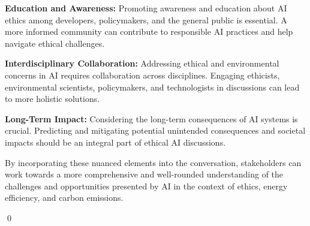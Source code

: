 \begin{enumarabic}
  \item \textbf{Education and Awareness:} Promoting awareness and education about AI ethics among developers, policymakers, and the general public is essential. A more informed community can contribute to responsible AI practices and help navigate ethical challenges.
  
  \item \textbf{Interdisciplinary Collaboration:} Addressing ethical and environmental concerns in AI requires collaboration across disciplines. Engaging ethicists, environmental scientists, policymakers, and technologists in discussions can lead to more holistic solutions.
  
  \item \textbf{Long-Term Impact:} Considering the long-term consequences of AI systems is crucial. Predicting and mitigating potential unintended consequences and societal impacts should be an integral part of ethical AI discussions.
\end{enumarabic}

By incorporating these nuanced elements into the conversation, stakeholders can work towards a more comprehensive and well-rounded understanding of the challenges and opportunities presented by AI in the context of ethics, energy efficiency, and carbon emissions.

\qed
